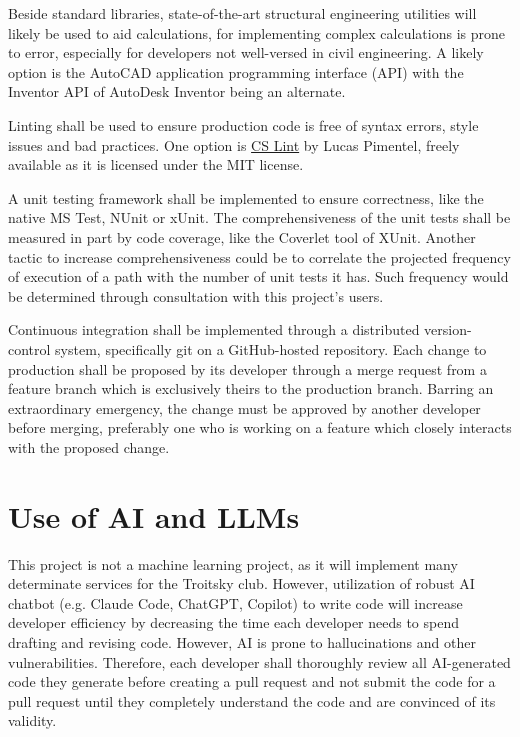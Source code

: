 \documentclass{article}
\begin{document}
Beside standard libraries, state-of-the-art structural engineering utilities will likely be used to aid calculations,
for implementing complex calculations is prone to error, especially for developers not well-versed in civil engineering.
A likely option is the AutoCAD application programming interface (API) with the Inventor API of AutoDesk Inventor being 
an alternate.

Linting shall be used to ensure production code is free of syntax errors, style issues and bad practices. 
One option is \href{https://github.com/lucaspimentel/cslint}{CS Lint} by Lucas Pimentel, 
freely available as it is licensed under the MIT license.

A unit testing framework shall be implemented to ensure correctness, like the native MS Test, NUnit or xUnit. 
The comprehensiveness of the unit
tests shall be measured in part by code coverage, like the Coverlet tool of XUnit. 
Another tactic to increase comprehensiveness could be to 
correlate the projected frequency of execution of a path with the number of unit tests it has. Such frequency would be determined through
consultation with this project's users.

Continuous integration shall be implemented through a distributed version-control system, specifically git on a GitHub-hosted repository.
Each change to production shall be proposed by its developer through a merge request from a feature branch which is exclusively theirs
to the production branch. Barring an extraordinary emergency, the change must be approved by another developer before merging, 
preferably one who is working on a feature which closely interacts with the proposed change. 




\section{Use of AI and LLMs}

This project is not a machine learning project, as it will implement many determinate services for the Troitsky club.
However, utilization of robust AI chatbot (e.g. Claude Code, ChatGPT, Copilot) to write code will increase developer efficiency by decreasing the time each
developer needs to spend drafting and revising code. However, AI is prone to hallucinations and other vulnerabilities. Therefore, each
developer shall thoroughly review all AI-generated code they generate before creating a pull request and not submit the code for a pull request
until they completely understand the code and are convinced of its validity.
\end{document}
